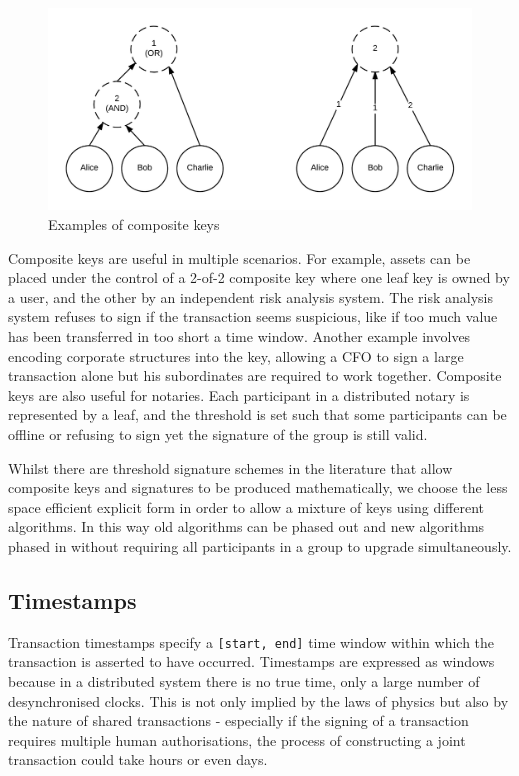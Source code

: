 \documentclass{article}
\begin{document}
\begin{figure}[H]
\includegraphics[width=\textwidth]{composite-keys}
\caption{Examples of composite keys}
\end{figure}

Composite keys are useful in multiple scenarios. For example, assets can be placed under the control of a 2-of-2
composite key where one leaf key is owned by a user, and the other by an independent risk analysis system. The
risk analysis system refuses to sign if the transaction seems suspicious, like if too much value has been
transferred in too short a time window. Another example involves encoding corporate structures into the key,
allowing a CFO to sign a large transaction alone but his subordinates are required to work together. Composite keys
are also useful for notaries. Each participant in a distributed notary is represented by a leaf, and the threshold
is set such that some participants can be offline or refusing to sign yet the signature of the group is still valid.

Whilst there are threshold signature schemes in the literature that allow composite keys and signatures to be produced
mathematically, we choose the less space efficient explicit form in order to allow a mixture of keys using different
algorithms. In this way old algorithms can be phased out and new algorithms phased in without requiring all
participants in a group to upgrade simultaneously.

\subsection{Timestamps}\label{sec:timestamps}

Transaction timestamps specify a \texttt{[start, end]} time window within which the transaction is asserted to have
occurred. Timestamps are expressed as windows because in a distributed system there is no true time, only a large number
of desynchronised clocks. This is not only implied by the laws of physics but also by the nature of shared transactions
- especially if the signing of a transaction requires multiple human authorisations, the process of constructing
a joint transaction could take hours or even days.
\end{document}
